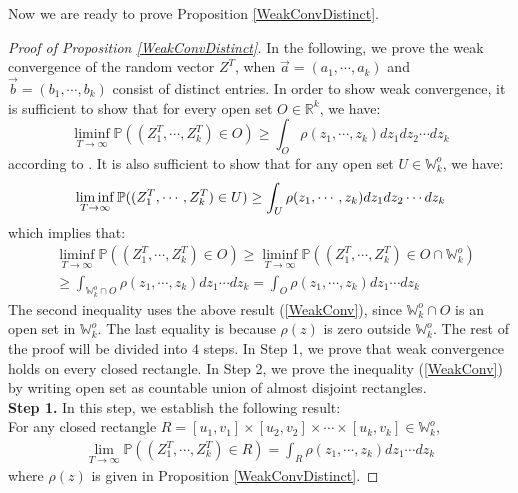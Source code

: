 Now we are ready to prove Proposition \ref{WeakConvDistinct}.
\begin{proof}[Proof of Proposition \ref{WeakConvDistinct}]
In the following, we prove the weak convergence of the random vector $Z^{T}$, when $\vec{a}=(a_{1},\cdots,a_{k})$ and $\vec{b}=(b_{1},\cdots,b_{k})$ consist of distinct entries. 
In order to show weak convergence, it is sufficient to show that for every open set $O\in\mathbb{R}^{k}$, we have: 
$$\liminf_{T\rightarrow\infty}\mathbb{P}((Z_{1}^{T},\cdots,Z_{k}^{T})\in O)\geq\int_{O}\rho(z_{1},\cdots,z_{k})dz_{1}dz_{2}\cdots dz_{k}$$
according to \cite[Theorem 3.2.11]{Durrett}. It is also sufficient to show that for any open set $U\in\mathbb{W}_{k}^{o}$, we have:
\begin{align}{\label{WeakConv}}
	\liminf_{T\rightarrow\infty}\mathbb{P}((Z_{1}^{T},\cdots,Z_{k}^{T})\in U)\geq\int_{U}\rho(z_{1},\cdots,z_{k})dz_{1}dz_{2}\cdots dz_{k}
\end{align}
which implies that:
\begin{align*}
	&\liminf_{T\rightarrow\infty}\mathbb{P}((Z_{1}^{T},\cdots,Z_{k}^{T})\in O)\geq\liminf_{T\rightarrow\infty}\mathbb{P}((Z_{1}^{T},\cdots,Z_{k}^{T})\in O\cap\mathbb{W}_{k}^{o})\\
	&\geq \int_{\mathbb{W}_{k}^{o}\cap O}\rho(z_{1},\cdots,z_{k})dz_{1}\cdots dz_{k}= \int_{O}\rho(z_{1},\cdots,z_{k})dz_{1}\cdots dz_{k}
\end{align*}
The second inequality uses the above result (\ref{WeakConv}), since $\mathbb{W}_{k}^{o}\cap O$ is an open set in $\mathbb{W}_{k}^{o}$. The last equality is because $\rho(z)$ is zero outside $\mathbb{W}_{k}^{o}$. The rest of the proof will be divided into $4$ steps. In Step 1, we prove that weak convergence holds on every closed rectangle. In Step 2, we prove the inequality (\ref{WeakConv}) by writing open set as countable union of almost disjoint rectangles. \\
\noindent \textbf{Step 1. }In this step, we establish the following result:\\
For any closed rectangle $R=[u_{1},v_{1}]\times [u_{2},v_{2}]\times\cdots\times[u_{k},v_{k}]\in\mathbb{W}_{k}^{o}$, 
\begin{align}
	\lim_{T\rightarrow\infty}\mathbb{P}((Z_{1}^{T},\cdots,Z_{k}^{T})\in R)=\int_{R}\rho(z_{1},\cdots,z_{k})dz_{1}\cdots dz_{k}
\end{align}
where $\rho(z)$ is given in Proposition \ref{WeakConvDistinct}.


\end{proof}
